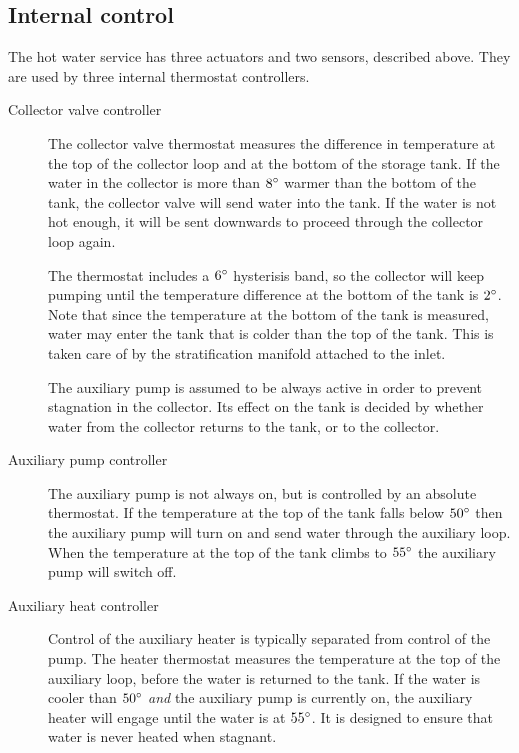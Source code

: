 \subsection{Internal control}
\label{sec:models:system:control}

The hot water service has three actuators and two sensors, described above.
They are used by three internal thermostat controllers.

\begin{description}
   \item[Collector valve controller]
      The collector valve thermostat measures the difference in temperature at the top of the collector loop and at the bottom of the storage tank.
      If the water in the collector is more than $8^{\circ}$ warmer than the bottom of the tank, the collector valve will send water into the tank.
      If the water is not hot enough, it will be sent downwards to proceed through the collector loop again.

      The thermostat includes a $6^{\circ}$ hysterisis band, so the collector will keep pumping until the temperature difference at the bottom of the tank is $2^{\circ}$.
      Note that since the temperature at the bottom of the tank is measured, water may enter the tank that is colder than the top of the tank.
      This is taken care of by the stratification manifold attached to the inlet.

      The auxiliary pump is assumed to be always active in order to prevent stagnation in the collector.
      Its effect on the tank is decided by whether water from the collector returns to the tank, or to the collector.

   \item[Auxiliary pump controller]
      The auxiliary pump is not always on, but is controlled by an absolute thermostat.
      If the temperature at the top of the tank falls below $50^{\circ}$ then the auxiliary pump will turn on and send water through the auxiliary loop.
      When the temperature at the top of the tank climbs to $55^{\circ}$ the auxiliary pump will switch off.

   \item[Auxiliary heat controller]
      Control of the auxiliary heater is typically separated from control of the pump.
      The heater thermostat measures the temperature at the top of the auxiliary loop, before the water is returned to the tank.
      If the water is cooler than $50^{\circ}$ \emph{and} the auxiliary pump is currently on, the auxiliary heater will engage until the water is at $55^{\circ}$.
      It is designed to ensure that water is never heated when stagnant.
\end{description}

